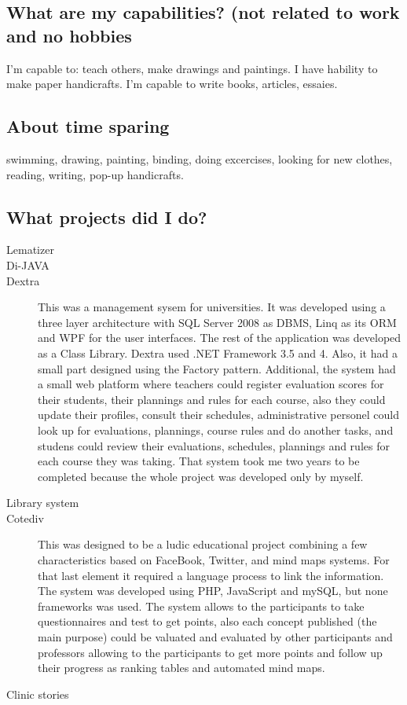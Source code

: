 \subsection{What are my capabilities? (not related to work and no hobbies}
\begin{multicols}{2}
I'm capable to: teach others, make drawings and paintings. I have hability to make paper handicrafts. I'm capable to write books, articles, essaies.
\end{multicols}

\subsection{About time sparing}
\begin{multicols}{2}
swimming, drawing, painting, binding, doing excercises, looking for new clothes, reading, writing, pop-up handicrafts.
\end{multicols}

\subsection{What projects did I do?}
\begin{multicols}{2}
\begin{description}
\item[Lematizer]
\item[Di-JAVA]
\item[Dextra] This was a management sysem for universities. It was developed using a three layer architecture with SQL Server 2008 as DBMS, Linq as  its ORM and WPF for the user interfaces. The rest of the application was developed as a Class Library. Dextra used .NET Framework 3.5 and 4. Also, it had a small part designed using the Factory pattern. Additional, the system had a small web platform where teachers could register evaluation scores for their students, their plannings and rules for each course, also they could update their profiles, consult their schedules, administrative personel could look up for evaluations, plannings, course rules and do another tasks, and studens could review their evaluations, schedules, plannings and rules for each course they was taking. That system took me two years to be completed because the whole project was developed only by myself.
\item[Library system]
\item[Cotediv] This was designed to be a ludic educational project combining a few characteristics based on FaceBook, Twitter, and mind maps systems. For that last element it required a language process to link the information. The system was developed using PHP, JavaScript and mySQL, but none frameworks was used. The system allows to the participants to take questionnaires and test to get points, also each concept published (the main purpose) could be valuated and evaluated by other participants and professors allowing to the participants to get more points and follow up their progress as ranking tables and automated mind maps.
\item[Clinic stories]
\end{description}
\end{multicols}

